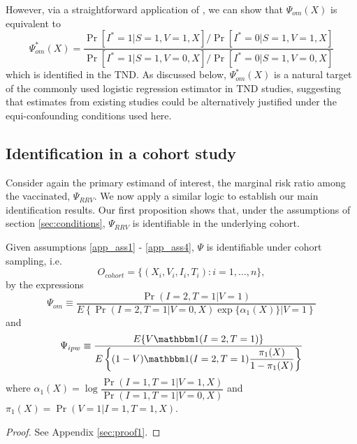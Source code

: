 \documentclass[11pt]{article}
\begin{document}
However, via a straightforward application of \textcite{breslow 1976}, we can show that $\Psi_{om}(X)$ is equivalent to
\begin{equation}\label{eqn:or_estimand_tnd}
    \Psi^*_{om}(X) = \dfrac{\Pr[I^* = 1 | S = 1, V = 1, X]/\Pr[I^* = 0 | S = 1, V = 1, X]}{\Pr[I^* = 1 | S = 1, V = 0, X]/\Pr[I^* = 0 | S = 1, V = 0, X]}
\end{equation}  
which is identified in the TND. As discussed below, $\Psi^*_{om}(X)$ is a natural target of the commonly used logistic regression estimator in TND studies, suggesting that estimates from existing studies could be alternatively justified under the equi-confounding conditions used here. 

\subsection{Identification in a cohort study}
Consider again the primary estimand of interest, the marginal risk ratio among the vaccinated, $\Psi_{RRV}$. We now apply a similar logic to establish our main identification results. Our first proposition shows that, under the assumptions of section \ref{sec:conditions}, $\Psi_{RRV}$ is identifiable in the underlying cohort. 
\begin{proposition}\label{prop1}
    Given assumptions \ref{app_ass1} - \ref{app_ass4}, $\Psi$ is identifiable under cohort sampling, i.e. 
    $$O_{cohort} = \{(X_i, V_i, I_i, T_i) : i = 1, \ldots, n\},$$ 
    by the expressions 
    \begin{equation}\label{eqn:om_estimand}
        \Psi_{om} \equiv \dfrac{\Pr(I = 2, T = 1 | V = 1)}{E\left\{\Pr(I = 2, T = 1 | V = 0, X) \exp\{\alpha_1(X)\} \Big| V = 1 \right\}}
    \end{equation}
    and 
    \begin{equation}\label{eqn:ipw_estimand}
        \Psi_{ipw} \equiv \dfrac{E\{V \mathbbm 1 (I = 2, T = 1)\}}{E\left\{ (1 - V) \mathbbm 1(I = 2, T = 1) \dfrac{\pi_1(X)}{1 - \pi_1(X)}\right\}}
    \end{equation}
    where $\alpha_1(X) = \log \dfrac{\Pr(I = 1, T = 1 | V = 1, X)}{\Pr(I = 1, T = 1 | V = 0, X)}$ and $\pi_1(X) = \Pr(V = 1| I = 1, T = 1, X)$.
    \end{proposition}

    \begin{proof}
        See Appendix \ref{sec:proof1}.
    \end{proof}
    
\end{document}
